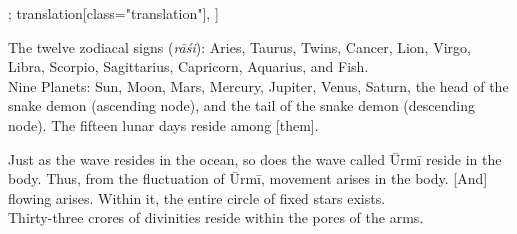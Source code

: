 \begin{alignment}[
  texts=edition[class="edition"];
  translation[class="translation"],
  ]
\begin{translation}
\begin{tlate}
The twelve zodiacal signs (\textit{rāśi}): Aries, Taurus, Twins, Cancer, Lion, Virgo, Libra, Scorpio, Sagittarius, Capricorn, Aquarius, and Fish.\\

Nine Planets: Sun, Moon, Mars, Mercury, Jupiter, Venus, Saturn, the head of the snake demon (ascending node), and the tail of the snake demon (descending node). The fifteen lunar days reside among [them].

Just as the wave resides in the ocean, so does the wave called Ūrmī reside in the body. Thus, from the fluctuation of Ūrmī, movement arises in the body. [And] flowing arises. Within it, the entire circle of fixed stars exists.\\

Thirty-three crores of divinities reside within the pores of the arms.
\end{tlate}
  \end{translation}
\end{alignment}
\pagebreak %
